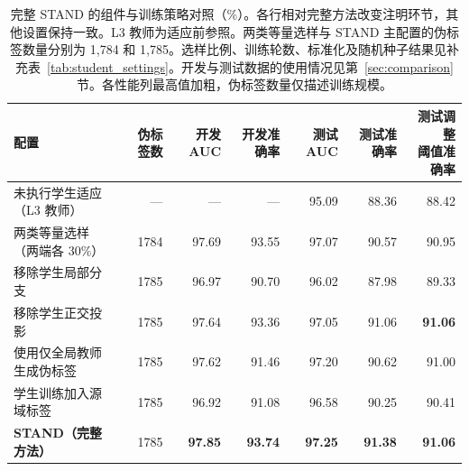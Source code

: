 \begin{table}[htbp]
\centering\small
\caption{完整 STAND 的组件与训练策略对照（\%）。各行相对完整方法改变注明环节，其他设置保持一致。L3 教师为适应前参照。两类等量选样与 STAND 主配置的伪标签数量分别为 1,784 和 1,785。选样比例、训练轮数、标准化及随机种子结果见补充表~\ref{tab:student_settings}。开发与测试数据的使用情况见第~\ref{sec:comparison} 节。各性能列最高值加粗，伪标签数量仅描述训练规模。}
\label{tab:ablation}
\begin{adjustbox}{max width=\linewidth}
\begin{tabular}{lrrrrrr}
\toprule
配置 & 伪标签数 & 开发 AUC & 开发准确率 & 测试 AUC & 测试准确率 & \makecell{测试调整\\阈值准确率}\\
\midrule
未执行学生适应（L3 教师） & --- & --- & --- & 95.09 & 88.36 & 88.42\\
两类等量选样（两端各 30\%） & 1784 & 97.69 & 93.55 & 97.07 & 90.57 & 90.95\\
移除学生局部分支 & 1785 & 96.97 & 90.70 & 96.02 & 87.98 & 89.33\\
移除学生正交投影 & 1785 & 97.64 & 93.36 & 97.05 & 91.06 & \textbf{91.06}\\
使用仅全局教师生成伪标签 & 1785 & 97.62 & 91.46 & 97.20 & 90.62 & 91.00\\
学生训练加入源域标签 & 1785 & 96.92 & 91.08 & 96.58 & 90.25 & 90.41\\
\textbf{STAND（完整方法）} & 1785 & \textbf{97.85} & \textbf{93.74} & \textbf{97.25} & \textbf{91.38} & \textbf{91.06}\\
\bottomrule
\end{tabular}
\end{adjustbox}
\end{table}
